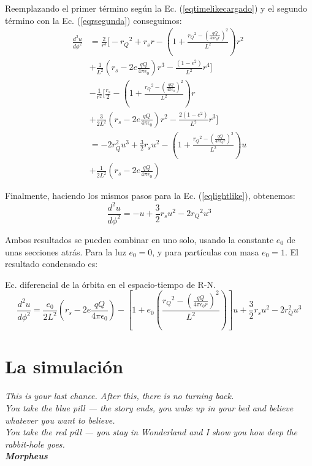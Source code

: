 Reemplazando el primer término según la Ec. (\ref{eqtimelikecargado}) y el segundo término con la Ec. (\ref{eqrsegunda}) conseguimos:
\begin{equation}
\begin{split}
    \frac{d^2 u}{d \phi^2} &= \frac{2}{r^3} \Big[ -{r_Q}^2 + r_s r - \left( 1 + \frac{{r_Q}^2 - \left(\frac{qQ}{4\pi\epsilon_0 r}\right)^2}{L^2} \right) r^2 \\&+ \frac{1}{L^2} \left(r_s - 2e\frac{qQ}{4\pi\epsilon_0}\right)r^3 - \frac{(1-e^2)}{L^2}r^4 \Big] \\&- \frac{1}{r^2} \Big[\frac{r_s}{2} - \left( 1 + \frac{{r_Q}^2 - \left(\frac{qQ}{4\pi\epsilon_0}\right)^2}{L^2} \right) r \\&+ \frac{3}{2 L^2} \left(r_s - 2e\frac{qQ}{4\pi\epsilon_0}\right)r^2 - \frac{2(1-e^2)}{L^2}r^3\Big]\\
    &= -2r_Q^2 u^3 + \frac{3}{2} r_s u^2 -\left( 1 + \frac{{r_Q}^2 - \left(\frac{qQ}{4\pi\epsilon_0 r}\right)^2}{L^2} \right) u \\&+ \frac{1}{2 L^2}\left(r_s - 2e\frac{qQ}{4\pi\epsilon_0}\right)
\end{split}
\end{equation}

Finalmente, haciendo los mismos pasos para la Ec. (\ref{eqlightlike}), obtenemos:
\begin{equation}
\frac{d^2 u}{d \phi^2} = -u + \frac{3}{2} r_s u^2 - 2 {r_Q}^2 u^3
\end{equation}

Ambos resultados se pueden combinar en uno solo, usando la constante $e_0$ de unas secciones atrás. Para la luz $e_0=0$, y para partículas con masa $e_0=1$. El resultado condensado es:
\begin{fullwidth}
\begin{remarkbox}{Ec. diferencial de la órbita en el espacio-tiempo de R-N.}
\begin{equation}
    \frac{d^2 u}{d \phi^2} =\frac{e_0}{2 L^2}\left(r_s - 2e\frac{qQ}{4\pi\epsilon_0}\right) -\left[ 1 + e_0\left( \frac{{r_Q}^2 - \left(\frac{qQ}{4\pi\epsilon_0 r}\right)^2}{L^2} \right)\right] u +\frac{3}{2} r_s u^2 - 2r_Q^2 u^3 
\label{lasube}
\end{equation}
\end{remarkbox}
\end{fullwidth}

\section{La simulación}
\begin{flushright}
\textit{This is your last chance. After this, there is no turning back.\\You take the blue pill — the story ends, you wake up in your bed and believe whatever you want to believe.\\You take the red pill — you stay in Wonderland and I show you how deep the rabbit-hole goes.\\\textbf{Morpheus}}
\end{flushright}

